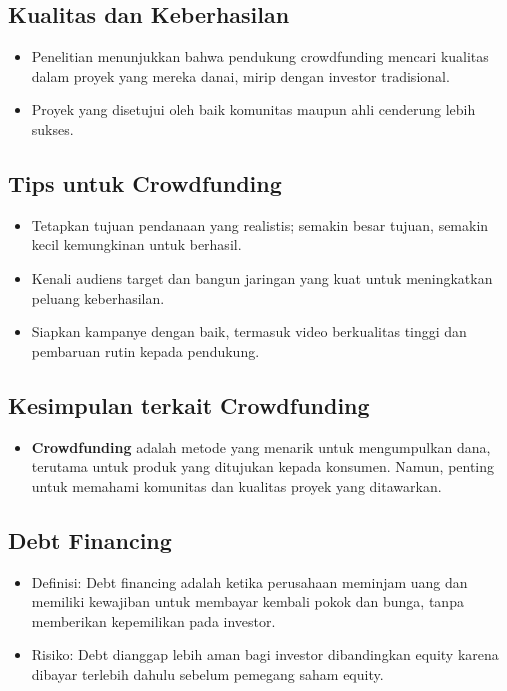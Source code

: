 \documentclass{article}
\begin{document}
\subsection{Kualitas dan Keberhasilan}
\begin{itemize}
    \item Penelitian menunjukkan bahwa pendukung crowdfunding mencari kualitas dalam proyek yang mereka danai, mirip dengan investor tradisional.
    \item Proyek yang disetujui oleh baik komunitas maupun ahli cenderung lebih sukses.
\end{itemize}

\subsection{Tips untuk Crowdfunding}
\begin{itemize}
    \item Tetapkan tujuan pendanaan yang realistis; semakin besar tujuan, semakin kecil kemungkinan untuk berhasil.
    \item Kenali audiens target dan bangun jaringan yang kuat untuk meningkatkan peluang keberhasilan.
    \item Siapkan kampanye dengan baik, termasuk video berkualitas tinggi dan pembaruan rutin kepada pendukung.
\end{itemize}

\subsection{Kesimpulan terkait Crowdfunding}
\begin{itemize}
    \item \textbf{Crowdfunding} adalah metode yang menarik untuk mengumpulkan dana, terutama untuk produk yang ditujukan kepada konsumen. Namun, penting untuk memahami komunitas dan kualitas proyek yang ditawarkan.
\end{itemize}

\subsection{Debt Financing}
\begin{itemize}
    \item Definisi: Debt financing adalah ketika perusahaan meminjam uang dan memiliki kewajiban untuk membayar kembali pokok dan bunga, tanpa memberikan kepemilikan pada investor.
    \item Risiko: Debt dianggap lebih aman bagi investor dibandingkan equity karena dibayar terlebih dahulu sebelum pemegang saham equity.
\end{itemize}
\end{document}
